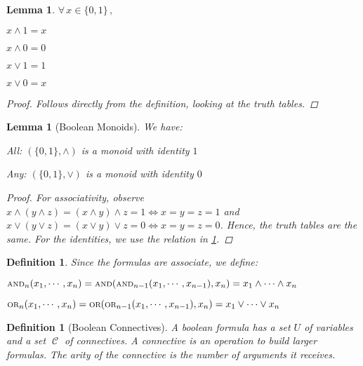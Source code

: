 \documentclass[12pt]{article}
\let\LR\Leftrightarrow
\let\aand\wedge
\let\oor\vee
\newcommand{\Forall}[1]{\forall\,{#1}\,,\,}
\newcommand{\scr}[1]{{\scriptstyle\textup{#1}}}
\DeclareMathOperator{\C}{\mathcal{C}}
\DeclareMathOperator{\OR}{\scr{OR}}
\DeclareMathOperator{\AND}{\scr{AND}}
\newcommand*{\B}{\{0,1\}}
\newtheorem{definition}[theorem]{Definition}
\newtheorem{lemma}[theorem]{Lemma}
\begin{document}
\begin{lemma}
  \label{bool_identity}
  $\Forall{x\in\B}$
  \begin{compactitem}
    \item $x\aand 1 = x$
    \item $x\aand 0 = 0$
    \item $x\oor 1 = 1$
    \item $x\oor 0 = x$
  \end{compactitem}
  \begin{proof}
    Follows directly from the definition, looking at the truth tables.
  \end{proof}
\end{lemma}

\begin{lemma}[Boolean Monoids]
  We have:
  \begin{compactitem}
    \item[] All: $(\B,\aand)$ is a monoid with identity $1$
    \item[] Any: $(\B,\oor)$ is a monoid with identity $0$
  \end{compactitem}
  \begin{proof}
    For associativity, observe $x\aand(y\aand z)=(x\aand y)\aand z=1\LR x=y=z=1$ and $x\oor(y\oor z)=(x\oor y)\oor z=0 \LR x=y=z=0$. Hence, the truth tables are the same. For the identities, we use the relation in \ref{bool_identity}.
  \end{proof}
\end{lemma}

\begin{definition}
  \label{associative_bools}
  Since the formulas are associate, we define:
  \begin{compactitem}
    \item $\AND_n(x_1,\cdots,x_n)=\AND(\AND_{n-1}(x_1,\cdots,x_{n-1}),x_n)=x_1\aand\cdots\aand x_n$
    \item $\OR_n(x_1,\cdots,x_n)=\OR(\OR_{n-1}(x_1,\cdots,x_{n-1}),x_n)=x_1\oor\cdots\oor x_n$
  \end{compactitem}
\end{definition}

\begin{definition}[Boolean Connectives]
  A boolean formula has a set $U$ of variables and a set $\C$ of connectives. A connective is an operation to build larger formulas. The arity of the connective is the number of arguments it receives.
\end{definition}
\end{document}
